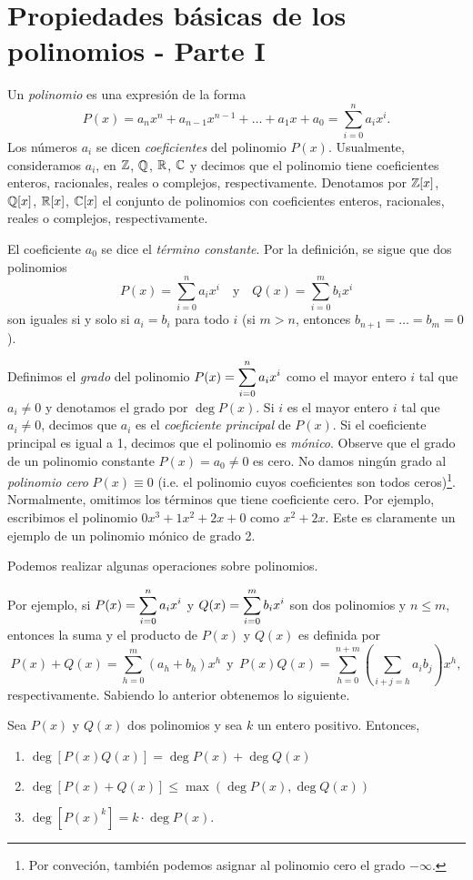 \chapter[Propiedades básicas. Primera parte]{Propiedades básicas de los polinomios - Parte I}

Un \textit{polinomio} es una expresión de la forma
\[
    P(x) = a_n x^n + a_{n - 1} x^{n - 1} + \ldots + a_1 x + a_0 = \sum_{i = 0}^{n} a_i x^i.
\]
Los números $a_i$ se dicen \textit{coeficientes} del polinomio $P(x)$.
Usualmente, consideramos $a_i$, en $\mathbb{Z}$, $\mathbb{Q}$, $\mathbb{R}$, $\mathbb{C}$ y decimos que el polinomio tiene coeficientes enteros, racionales, reales o complejos, respectivamente.
Denotamos por $\mathbb{Z}[x]$, $\mathbb{Q}[x]$, $\mathbb{R}[x]$, $\mathbb{C}[x]$ el conjunto de polinomios con coeficientes enteros, racionales, reales o complejos, respectivamente.

El coeficiente $a_0$ se dice el \textit{término constante}.
Por la definición, se sigue que dos polinomios
\[
    P(x) = \sum_{i = 0}^{n} a_i x^i \quad \text{y} \quad Q(x) = \sum_{i = 0}^{m} b_i x^i
\]
son iguales si y solo si $a_i = b_i$ para todo $i$ (si $m > n$, entonces $b_{n + 1} = \ldots = b_m = 0$).

Definimos el \textit{grado} del polinomio $P(x) = \displaystyle \sum_{i = 0}^{n} a_i x^i $ como el mayor entero $i$ tal que $a_i \neq 0$ y denotamos el grado por $\deg P(x)$.
Si $i$ es el mayor entero $i$ tal que $a_i \neq 0$, decimos que $a_i$ es el \textit{coeficiente principal} de $P(x)$.
Si el coeficiente principal es igual a 1, decimos que el polinomio es \textit{mónico}.
Observe que el grado de un polinomio constante $P(x) = a_0 \neq 0$ es cero.
No damos ningún grado al \textit{polinomio cero} $P(x) \equiv 0$ (i.e. el polinomio cuyos coeficientes son todos ceros)\footnote{Por conveción, también podemos asignar al polinomio cero el grado $- \infty$.}.
Normalmente, omitimos los términos que tiene coeficiente cero.
Por ejemplo, escribimos el polinomio $0x^3 + 1x^2 + 2x + 0$ como $x^2 + 2x$.
Este es claramente un ejemplo de un polinomio mónico de grado 2.

Podemos realizar algunas operaciones sobre polinomios.

Por ejemplo, si $P(x) = \displaystyle \sum_{i = 0}^{n} a_i x^i$ y $Q(x) = \displaystyle \sum_{i = 0}^{m} b_i x^i $ son dos polinomios y $n \leq m$, entonces la suma y el producto de $P(x)$ y $Q(x)$ es definida por
\[
    P(x) + Q(x) = \sum_{h = 0}^{m} (a_h + b_h) x^h \ \ \text{y} \ \ P(x)Q(x) = \sum_{h = 0}^{n + m} \left(\sum_{i + j = h} a_i b_j \right)x^h,
\]
respectivamente.
Sabiendo lo anterior obtenemos lo siguiente.
\begin{theorem}{}{}
    Sea $P(x)$ y $Q(x)$ dos polinomios y sea $k$ un entero positivo.
    Entonces,
    \begin{enumerate}
        \item $\deg [P(x) Q(x)] = \deg P(x) + \deg Q(x)$
        \item $\deg [P(x) + Q(x)] \leq \max (\deg P(x), \deg Q(x))$
        \item $\deg [P(x)^k] = k \cdot \deg P(x)$.
    \end{enumerate}
\end{theorem}





